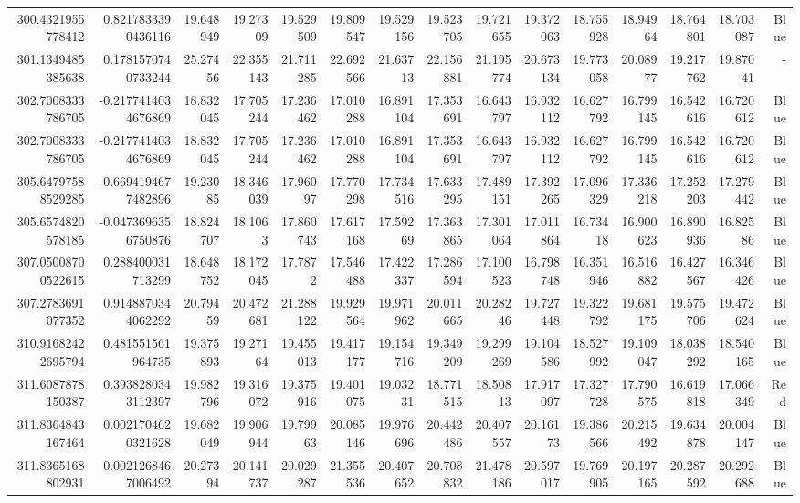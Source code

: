 \begin{center}
\begin{longtable}{rrrrrrrrrrrrrrr}
300.4321955778412 & 0.8217833390436116 & 19.648949 & 19.27309 & 19.529509 & 19.809547 & 19.529156 & 19.523705 & 19.721655 & 19.372063 & 18.755928 & 18.94964 & 18.764801 & 18.703087 & Blue \\
301.1349485385638 & 0.1781570740733244 & 25.27456 & 22.355143 & 21.711285 & 22.692566 & 21.63713 & 22.156881 & 21.195774 & 20.673134 & 19.773058 & 20.08977 & 19.217762 & 19.87041 & - \\
302.7008333786705 & -0.2177414034676869 & 18.832045 & 17.705244 & 17.236462 & 17.010288 & 16.891104 & 17.353691 & 16.643797 & 16.932112 & 16.627792 & 16.799145 & 16.542616 & 16.720612 & Blue \\
302.7008333786705 & -0.2177414034676869 & 18.832045 & 17.705244 & 17.236462 & 17.010288 & 16.891104 & 17.353691 & 16.643797 & 16.932112 & 16.627792 & 16.799145 & 16.542616 & 16.720612 & Blue \\
305.64797588529285 & -0.6694194677482896 & 19.23085 & 18.346039 & 17.96097 & 17.770298 & 17.734516 & 17.633295 & 17.489151 & 17.392265 & 17.096329 & 17.336218 & 17.252203 & 17.279442 & Blue \\
305.6574820578185 & -0.0473696356750876 & 18.824707 & 18.1063 & 17.860743 & 17.617168 & 17.59269 & 17.363865 & 17.301064 & 17.011864 & 16.73418 & 16.900623 & 16.890936 & 16.82586 & Blue \\
307.05008700522615 & 0.288400031713299 & 18.648752 & 18.172045 & 17.7872 & 17.546488 & 17.422337 & 17.286594 & 17.100523 & 16.798748 & 16.351946 & 16.516882 & 16.427567 & 16.346426 & Blue \\
307.2783691077352 & 0.9148870344062292 & 20.79459 & 20.472681 & 21.288122 & 19.929564 & 19.971962 & 20.011665 & 20.28246 & 19.727448 & 19.322792 & 19.681175 & 19.575706 & 19.472624 & Blue \\
310.91682422695794 & 0.481551561964735 & 19.375893 & 19.27164 & 19.455013 & 19.417177 & 19.154716 & 19.349209 & 19.299269 & 19.104586 & 18.527992 & 19.109047 & 18.038292 & 18.540165 & Blue \\
311.6087878150387 & 0.3938280343112397 & 19.982796 & 19.316072 & 19.375916 & 19.401075 & 19.03231 & 18.771515 & 18.50813 & 17.917097 & 17.327728 & 17.790575 & 16.619818 & 17.066349 & Red \\
311.8364843167464 & 0.0021704620321628 & 19.682049 & 19.906944 & 19.79963 & 20.085146 & 19.976696 & 20.442486 & 20.407557 & 20.16173 & 19.386566 & 20.215492 & 19.634878 & 20.004147 & Blue \\
311.8365168802931 & 0.0021268467006492 & 20.27394 & 20.141737 & 20.029287 & 21.355536 & 20.407652 & 20.708832 & 21.478186 & 20.597017 & 19.769905 & 20.197165 & 20.287592 & 20.292688 & Blue \\

\end{longtable}
\end{center}
